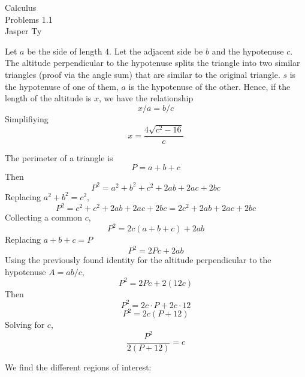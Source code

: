 \documentclass{article}
\begin{document}
\begin{mytitle}
    Calculus \\
    Problems 1.1 \\
    \normalsize Jasper Ty
\end{mytitle}

\begin{Answer}
    Let $a$ be the side of length $4$. Let the adjacent side be $b$ and the hypotenuse $c$.
    The altitude perpendicular to the hypotenuse splits the triangle into two similar triangles (proof via the angle sum) that are similar to the original triangle. $s$ is the hypotenuse of one of them, $a$ is the hypotenuse of the other. Hence, if the length of the altitude is $x$, we have the relationship
    \[x / a = b / c\]
    Simplifiying
    \[x = \frac{4\sqrt{c^2-16}}{c}\]
\end{Answer}

\begin{Answer}
    The perimeter of a triangle is 
    \[P = a + b + c\]
    Then
    \[P^2 = a^2 + b^2 + c^2 + 2ab + 2ac + 2bc\]
    Replacing $a^2 + b^2 = c^2$,
    \[P^2 = c^2 + c^2 + 2ab + 2ac + 2bc = 2c^2 + 2ab + 2ac + 2bc\]
    Collecting a common $c$,
    \[P^2 = 2c(a + b + c) + 2ab\]
    Replacing $a + b + c = P$
    \[P^2 = 2Pc + 2ab\]
    Using the previously found identity for the altitude perpendicular to the hypotenuse $A = ab/c$,
    \[P^2 = 2Pc + 2(12c)\]
    Then 
    \[P^2 = 2c \cdot P + 2c \cdot 12\]
    \[P^2 = 2c(P + 12)\]
    Solving for $c$,
    \[\frac{P^2}{2(P+12)} = c\]
\end{Answer}

\begin{Answer}
    We find the different regions of interest:

\end{Answer}
\end{document}
